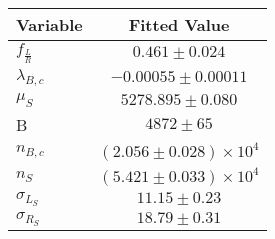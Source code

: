 \begin{tabular}[t]{lc}
\hline
Variable &Fitted Value\\
\hline\hline
$f_{\frac{L}{R}}$&$0.461\pm0.024$\\
\hline
$\lambda_{B,c}$&$-0.00055\pm0.00011$\\
\hline
$\mu_S$&$5278.895\pm0.080$\\
\hline
B&$4872\pm65$\\
\hline
$n_{B,c}$&$(2.056\pm0.028)\times 10^4$\\
\hline
$n_S$&$(5.421\pm0.033)\times 10^4$\\
\hline
$\sigma_{L_S}$&$11.15\pm0.23$\\
\hline
$\sigma_{R_S}$&$18.79\pm0.31$\\
\hline
\end{tabular}